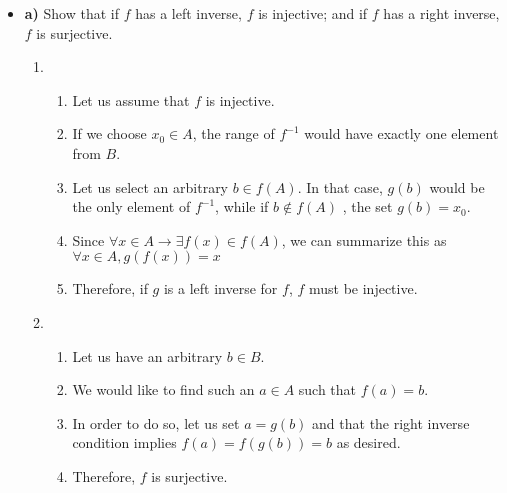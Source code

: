 \documentclass[12pt]{article}
\begin{document}
\begin{itemize}
    \item  \textbf{a)} Show that if $f$ has a left inverse, $f$ is injective; and if $f$ has a right inverse, $f$ is surjective.
    \begin{enumerate}
        \item 
        \begin{enumerate}
            \item 
        Let us assume that $f$ is injective.
        \item If we choose $x_0 \in A$, the range of $f^{-1}$ would have exactly one element from $B$. 
        \item Let us select an arbitrary $b \in f(A)$. In that case, $g(b)$ would be the only element of $f^{-1}$, while if $b \notin f(A)$ , the set $g(b)=x_0$. 
        \item Since $\forall x \in A \rightarrow \exists f(x) \in f(A)$, we can summarize this as $\forall x \in A,  g(f(x))=x$ 
        \item Therefore, if $g$ is a left inverse for $f$, $f$ must be injective.
        \end{enumerate}
        \item 
        \begin{enumerate}
            \item Let us have an arbitrary $b \in B$. 
            \item We would like to find such an $a \in A$ such that $f(a)=b$. 
            \item In order to do so, let us set $a=g(b)$ and that the right inverse condition implies $f(a)=f(g(b))=b$ as desired.
            \item Therefore, $f$ is surjective.
        \end{enumerate}
    \end{enumerate}
    
    
    

\end{itemize}
\end{document}
